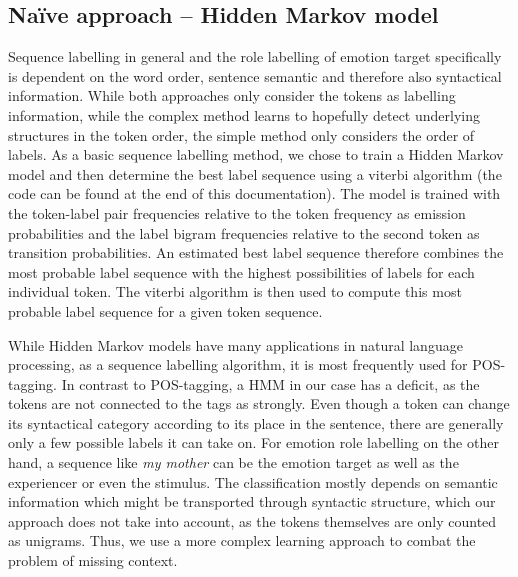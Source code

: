 \documentclass[12pt,pdftex,a4paper]{scrartcl}
\begin{document}
\subsection{Na\"{i}ve approach -- Hidden Markov model}
Sequence labelling in general and the role labelling of emotion target specifically is dependent on the word order, sentence semantic and therefore also syntactical information. While both approaches only consider the tokens as labelling information, while the complex method learns to hopefully detect underlying structures in the token order, the simple method only considers the order of labels. As a basic sequence labelling method, we chose to train a Hidden Markov model and then determine the best label sequence using a viterbi algorithm (the code can be found at the end of this documentation). The model is trained with the token-label pair frequencies relative to the token frequency as emission probabilities and the label bigram frequencies relative to the second token as transition probabilities. An estimated best label sequence therefore combines the most probable label sequence with the highest possibilities of labels for each individual token. The viterbi algorithm is then used to compute this most probable label sequence for a given token sequence. 

While Hidden Markov models have many applications in natural language processing, as a sequence labelling algorithm, it is most frequently used for POS-tagging. In contrast to POS-tagging, a HMM in our case has a deficit, as the tokens are not connected to the tags as strongly. Even though a token can change its syntactical category according to its place in the sentence, there are generally only a few possible labels it can take on. For emotion role labelling on the other hand, a sequence like \textit{my mother} can be the emotion target as well as the experiencer or even the stimulus. The classification mostly depends on semantic information which might be transported through syntactic structure, which our approach does not take into account, as the tokens themselves are only counted as unigrams. Thus, we use a more complex learning approach to combat the problem of missing context. 
\end{document}
